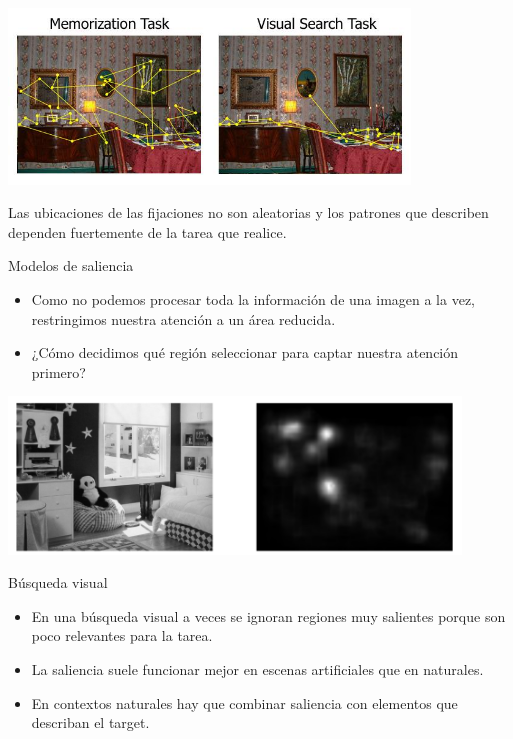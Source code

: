 \documentclass[compress]{beamer}
\begin{document}
\begin{frame}
\begin{center}
\includegraphics[width=0.8\textwidth]{images/castelhano-fixations.jpg}
\end{center}

Las ubicaciones de las fijaciones no son aleatorias y los patrones que describen dependen fuertemente de la tarea que realice.
\end{frame}

\begin{frame}{Modelos de saliencia}

\begin{itemize}
\item Como no podemos procesar toda la información de una imagen a la vez, restringimos nuestra atención a un área reducida. 
\item ¿Cómo decidimos qué región seleccionar para captar nuestra atención primero?
\end{itemize}

\begin{center}
\includegraphics[width=0.9\textwidth]{images/ejemplo-mlnet.png}
\end{center}

\end{frame}

\begin{frame}{Búsqueda visual}
\begin{itemize}
\item En una búsqueda visual a veces se ignoran regiones muy salientes porque son poco relevantes para la tarea.
\item La saliencia suele funcionar mejor en escenas artificiales que en naturales.
\item En contextos naturales hay que combinar saliencia con elementos que describan el target.
\end{itemize}
\end{frame}
\end{document}
